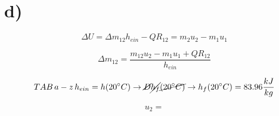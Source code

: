 

\section*{d)}

\[
\Delta U = \Delta m_{12} h_{ein} - QR_{12} = m_{2} u_{2} - m_{1} u_{1}
\]

\[
\Delta m_{12} = \frac{m_{12} u_{2} - m_{1} u_{1} + QR_{12}}{h_{ein}}
\]

\[
TAB \, a-z \, h_{ein} = h(20^\circ C) \rightarrow \cancel{D} \cancel{h_{f}} \cancel{(20^\circ C)} \rightarrow h_{f} (20^\circ C) = 83.96 \frac{kJ}{kg}
\]

\[
u_{2} =
\]